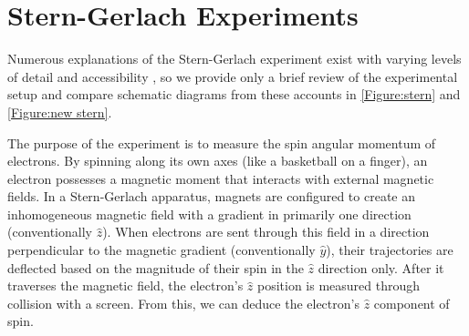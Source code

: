%
%
%
%

\chapter{Stern-Gerlach Experiments}
Numerous explanations of the Stern-Gerlach experiment exist with varying levels of detail and accessibility \cite{mcintyre, bocking, rodriguez, stern}, so we provide only a brief review of the experimental setup and compare schematic diagrams from these accounts in  \autoref{Figure:stern} and \autoref{Figure:new stern}.

The purpose of the experiment is to measure the spin angular momentum of electrons. By spinning along its own axes (like a basketball on a finger), an electron possesses a magnetic moment that interacts with external magnetic fields. In a Stern-Gerlach apparatus, magnets are configured to create an inhomogeneous magnetic field with a gradient in primarily one direction (conventionally $\hat{z}$). When electrons are sent through this field in a direction perpendicular to the magnetic gradient (conventionally $\hat{y}$), their trajectories are deflected based on the magnitude of their spin in the $\hat{z}$ direction only. After it traverses the magnetic field, the electron's $\hat{z}$ position is measured through collision with a screen. From this, we can deduce the electron's $\hat{z}$ component of spin.


